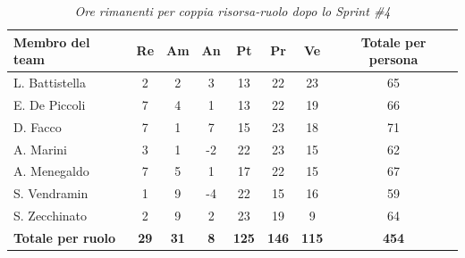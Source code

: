 \documentclass[a4paper, 10pt, colorlinks=true, linkcolor=black, urlcolor=blue, citecolor=blue, hidelinks]{article}
\renewcommand{\arraystretch}{1.2}
\begin{document}
\begin{table}[H]
    \centering
    \renewcommand{\arraystretch}{1.4}
    \begin{tabular}{|l|c|c|c|c|c|c|c|}
        \hline
        \rowcolor{bluBitless!15}
        \textbf{Membro del team} & \textbf{Re} & \textbf{Am} & \textbf{An} & \textbf{Pt} & \textbf{Pr} & \textbf{Ve} & \textbf{Totale per persona} \\
        \hline
        L. Battistella & 2 & 2 & 3 & 13 & 22 & 23 & 65 \\ \hline
        E. De Piccoli & 7 & 4 & 1 & 13 & 22 & 19 & 66 \\ \hline
        D. Facco & 7 & 1 & 7 & 15 & 23 & 18 & 71 \\ \hline
        A. Marini & 3 & 1 & -2 & 22 & 23 & 15 & 62 \\ \hline
        A. Menegaldo & 7 & 5 & 1 & 17 & 22 & 15 & 67 \\ \hline
        S. Vendramin & 1 & 9 & -4 & 22 & 15 & 16 & 59 \\ \hline
        S. Zecchinato & 2 & 9 & 2 & 23 & 19 & 9 & 64 \\ \hline
        \rowcolor{bluBitless!8}
        \textbf{Totale per ruolo} & \textbf{29} & \textbf{31} & \textbf{8} & \textbf{125} & \textbf{146} & \textbf{115} & \textbf{454} \\
        \hline
    \end{tabular}
    \caption{\textit{Ore rimanenti per coppia risorsa-ruolo dopo lo Sprint \#4}}
\end{table}
\end{document}
